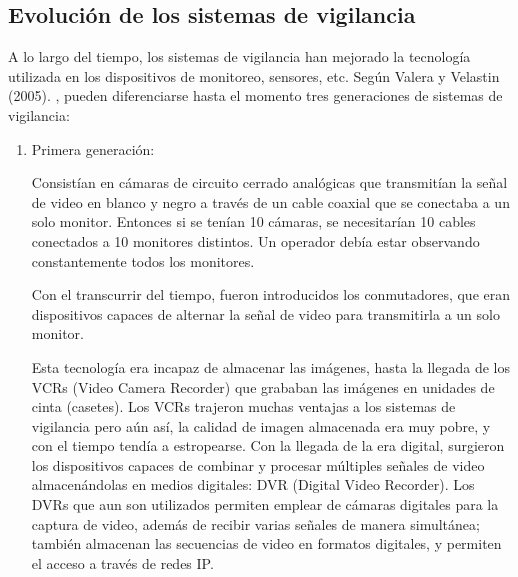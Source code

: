 \documentclass[a4paper,12pt,oneside,spanish]{book}
\begin{document}
\subsection{Evolución de los sistemas de vigilancia}
A lo largo del tiempo, los sistemas de vigilancia han mejorado la tecnología utilizada en los dispositivos de monitoreo, sensores, etc. Según Valera y  Velastin (2005). \cite{valera}, pueden diferenciarse hasta el momento tres generaciones de sistemas de vigilancia:
\begin{enumerate}
	\baselineskip 16pt
	\item Primera generación: \par 
	Consistían en cámaras de circuito cerrado analógicas que transmitían la señal de video en blanco y negro a través de un cable coaxial que se conectaba a un solo monitor. Entonces si se tenían 10 cámaras, se necesitarían 10 cables conectados a 10 monitores distintos. Un operador debía estar observando constantemente todos los monitores. \par 
	Con el transcurrir del tiempo, fueron introducidos los conmutadores, que eran dispositivos capaces de alternar la señal de video para transmitirla a un solo monitor. \par  
	Esta tecnología era incapaz de almacenar las imágenes, hasta la llegada de los VCRs (Video Camera Recorder) que grababan las imágenes en unidades de cinta (casetes). Los VCRs trajeron muchas ventajas a los sistemas de vigilancia pero aún así, la calidad de imagen almacenada era muy pobre, y con el tiempo tendía a estropearse. Con la llegada de la era digital, surgieron los dispositivos capaces de combinar y procesar múltiples señales de video almacenándolas en medios digitales: DVR (Digital Video Recorder). Los DVRs que aun son utilizados permiten emplear de cámaras digitales para la captura de video, además de recibir varias señales de manera simultánea; también almacenan las secuencias de video en formatos digitales, y permiten el acceso a través de redes IP.\\	
	

\end{enumerate}
\end{document}
